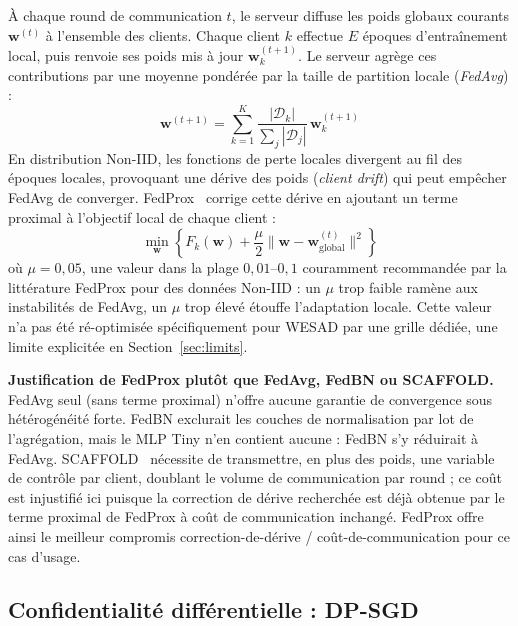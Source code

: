 \documentclass{acmart}
\begin{document}
À chaque round de communication $t$, le serveur diffuse les poids globaux
courants $\mathbf{w}^{(t)}$ à l'ensemble des clients. Chaque client $k$
effectue $E$ époques d'entraînement local, puis renvoie ses poids mis à jour
$\mathbf{w}_k^{(t+1)}$. Le serveur agrège ces contributions par une moyenne
pondérée par la taille de partition locale (\textit{FedAvg}) :
\begin{equation}
  \mathbf{w}^{(t+1)} = \sum_{k=1}^{K} \frac{|\mathcal{D}_k|}{\sum_j |\mathcal{D}_j|}
  \, \mathbf{w}_k^{(t+1)}
  \label{eq:fedavg}
\end{equation}
En distribution Non-IID, les fonctions de perte locales divergent au fil des
époques locales, provoquant une dérive des poids (\textit{client drift}) qui
peut empêcher FedAvg de converger. FedProx~\cite{li2020fedprox} corrige cette
dérive en ajoutant un terme proximal à l'objectif local de chaque client :
\begin{equation}
  \min_{\mathbf{w}} \left\{ F_k(\mathbf{w}) + \frac{\mu}{2}
  \| \mathbf{w} - \mathbf{w}^{(t)}_{\text{global}} \|^2 \right\}
  \label{eq:fedprox_form}
\end{equation}
où $\mu = 0{,}05$, une valeur dans la plage $0{,}01$--$0{,}1$ couramment
recommandée par la littérature FedProx pour des données Non-IID
\cite{li2020fedprox} : un $\mu$ trop faible ramène aux instabilités de
FedAvg, un $\mu$ trop élevé étouffe l'adaptation locale. Cette valeur n'a
pas été ré-optimisée spécifiquement pour WESAD par une grille dédiée, une
limite explicitée en Section~\ref{sec:limits}.

\textbf{Justification de FedProx plutôt que FedAvg, FedBN ou SCAFFOLD.}
FedAvg seul (sans terme proximal) n'offre aucune garantie de convergence sous
hétérogénéité forte. FedBN exclurait les couches de normalisation par
lot de l'agrégation, mais le MLP Tiny n'en contient aucune : FedBN s'y
réduirait à FedAvg. SCAFFOLD~\cite{karimireddy2020scaffold} nécessite de transmettre, en plus des poids, une
variable de contrôle par client, doublant le volume de communication par
round ; ce coût est injustifié ici puisque la correction de dérive
recherchée est déjà obtenue par le terme proximal de FedProx à coût de
communication inchangé. FedProx offre ainsi le meilleur compromis
correction-de-dérive / coût-de-communication pour ce cas d'usage.

\subsection{Confidentialité différentielle : DP-SGD}
\label{subsec:dp}
\end{document}
